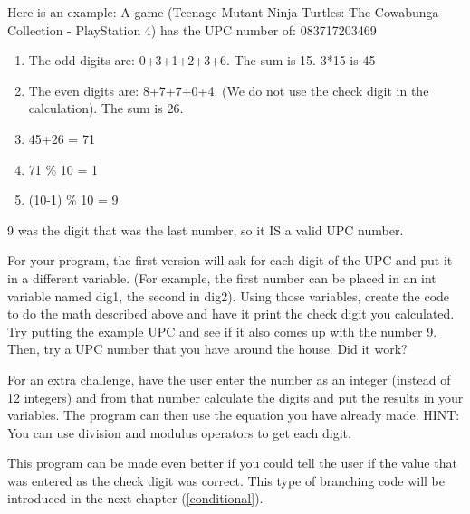 Here is an example: A game (Teenage Mutant Ninja Turtles: The Cowabunga Collection - PlayStation 4) has the UPC number of:
083717203469
\begin{enumerate}
    \item The odd digits are: 0+3+1+2+3+6. The sum is 15. 3*15 is 45
    \item The even digits are: 8+7+7+0+4. (We do not use the check digit in the calculation). The sum is 26.
    \item 45+26 = 71
    \item 71 \% 10 = 1
    \item (10-1) \% 10 = 9
\end{enumerate}
9 was the digit that was the last number, so it IS a valid UPC 
number.

For your program, the first version will ask for each digit
of the UPC and put it in a different variable. (For example,
the first number can be placed in an int variable named dig1, 
the second in dig2). Using those variables, create the code
to do the math described above and have it print the check
digit you calculated. Try putting the example UPC
and see if it also comes up with the number 9. Then, try a
UPC number that you have around the house. Did it work?

For an extra challenge, have the user enter the number as
an integer (instead of 12 integers) and from that number
calculate the digits and put the results in your variables.
The program can then use the equation you have already made.
HINT: You can use division and modulus operators to get
each digit.

This program can be made even better if you could tell the
user if the value that was entered as the check digit was 
correct. This type of branching code will be introduced in 
the next chapter (\ref{conditional}).
